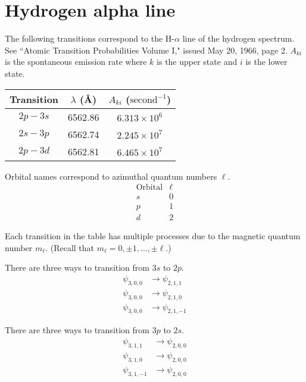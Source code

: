 

\section*{Hydrogen alpha line}

The following transitions correspond to the H-$\alpha$ line of the hydrogen spectrum.
See ``Atomic Transition Probabilities Volume I," issued May 20, 1966, page 2.
$A_{ki}$ is the spontaneous emission rate where $k$ is the upper state and $i$ is the lower state.

\begin{center}
\begin{tabular}{|c|c|c|}
\hline
Transition & $\lambda$ (\AA) & $A_{ki}$ ($\text{second}^{-1}$)
\\
\hline
$2p-3s$ & 6562.86 & $6.313\times10^6$
\\
$2s-3p$ & 6562.74 & $2.245\times10^7$
\\
$2p-3d$ & 6562.81 & $6.465\times10^7$
\\
\hline
\end{tabular}
\end{center}

Orbital names correspond to azimuthal quantum numbers $\ell$.
\begin{equation*}
\begin{matrix}
\text{Orbital} & \ell
\\
s & 0
\\
p & 1
\\
d & 2
\end{matrix}
\end{equation*}

Each transition in the table has multiple processes due to the magnetic quantum number $m_\ell$.
(Recall that $m_\ell=0,\pm1,\ldots,\pm\ell$.)

\bigskip
There are three ways to transition from $3s$ to $2p$.
\begin{align*}
\psi_{3,0,0}&\rightarrow\psi_{2,1,1}
\\
\psi_{3,0,0}&\rightarrow\psi_{2,1,0}
\\
\psi_{3,0,0}&\rightarrow\psi_{2,1,-1}
\end{align*}

There are three ways to transition from $3p$ to $2s$.
\begin{align*}
\psi_{3,1,1}&\rightarrow\psi_{2,0,0}
\\
\psi_{3,1,0}&\rightarrow\psi_{2,0,0}
\\
\psi_{3,1,-1}&\rightarrow\psi_{2,0,0}
\end{align*}

